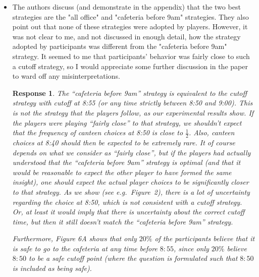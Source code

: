 \documentclass[a4paper]{article}
\newtheorem{response}{Response}
\newenvironment{tobo}{\smallskip \noindent \color{yellow!80!black!80}}{\color{black}\smallskip}
\begin{document}
\begin{itemize}
 \item The authors discuss (and demonstrate in the appendix) that the two best strategies are the "all office" and "cafeteria before 9am" strategies. They also point out that none of these strategies were adopted by players. However, it was not clear to me, and not discussed in enough detail, how the strategy adopted by participants was different from the "cafeteria before 9am" strategy. It seemed to me that participants' behavior was fairly close to such a cutoff strategy, so I would appreciate some further discussion in the paper to ward off any misinterpretations.
 \begin{response}
 The ``cafeteria before 9am'' strategy is equivalent to the cutoff strategy with cutoff at 8:55 (or any time strictly between 8:50 and 9:00). This is not the strategy that the players follow, as our experimental results show. If the players were playing ``fairly close'' to that strategy, we shouldn't expect that the frequency of canteen choices at 8:50 is close to $\frac{1}{2}$. Also, canteen choices at 8:40 should then be expected to be extremely rare. It of course depends on what we consider as ``fairly close'', but if the players had actually understood that the ``cafeteria before 9am'' strategy is optimal (and that it would be reasonable to expect the other player to have formed the same insight), one should expect the actual player choices to be significantly closer to that strategy. As we show (see e.g.~Figure~2), there is a lot of uncertainty regarding the choice at 8:50, which is not consistent with a cutoff strategy. Or, at least it would imply that there is uncertainty about the correct cutoff time, but then it still doesn't match the ``cafeteria before 9am'' strategy.  
 
 Furthermore, Figure 6A shows that only $20\%$ of the participants believe that it is safe to go to the cafeteria at any time before $8{:}55$, since only $20\%$ believe $8{:}50$ to be a safe cutoff point (where the question is formulated such that $8{:}50$ is included as being safe). 
 \end{response}
 
\end{itemize}
\end{document}
